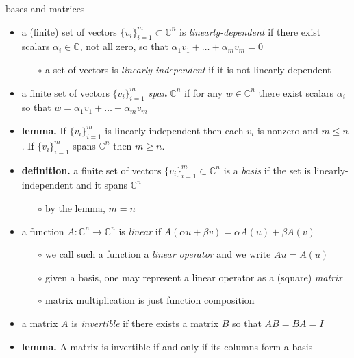 \documentclass[10pt,hyperref]{beamer}
\newcommand{\CC}{\mathbb{C}}
\begin{document}
\begin{frame}{bases and matrices}

\begin{itemize}
\item a (finite) set of vectors $\{v_i\}_{i=1}^m \subset \CC^n$ is \emph{linearly-dependent} if there exist scalars $\alpha_i \in \CC$, not all zero, so that $\alpha_1 v_1 + \dots + \alpha_m v_m = 0$
    \begin{itemize}
    \item[$\circ$] a set of vectors is \emph{linearly-independent} if it is not linearly-dependent
    \end{itemize}
\item a finite set of vectors $\{v_i\}_{i=1}^m$ \emph{span} $\CC^n$ if for any $w\in \CC^n$ there exist scalars $\alpha_i$ so that $w = \alpha_1 v_1 + \dots + \alpha_m v_m$
\item \textbf{lemma.}  If $\{v_i\}_{i=1}^m$ is linearly-independent then each $v_i$ is nonzero and $m \le n$.  If $\{v_i\}_{i=1}^m$ spans $\CC^n$ then $m \ge n$.
\item \textbf{definition.} a finite set of vectors $\{v_i\}_{i=1}^m \subset \CC^n$ is a \emph{basis} if the set is linearly-independent and it spans $\CC^n$
    \begin{itemize}
    \item[$\circ$] by the lemma, $m=n$
    \end{itemize}
\item a function $A:\CC^n \to \CC^n$ is \emph{linear} if $A(\alpha u+\beta v) = \alpha A(u) + \beta A(v)$
    \begin{itemize}
    \item[$\circ$] we call such a function a \emph{linear operator} and we write $Au=A(u)$
    \item[$\circ$] given a basis, one may represent a linear operator as a (square) \emph{matrix}
    \item[$\circ$] matrix multiplication is just function composition
    \end{itemize}
\item a matrix $A$ is \emph{invertible} if there exists a matrix $B$ so that $AB=BA=I$
\item \textbf{lemma.} A matrix is invertible if and only if its columns form a basis
\end{itemize}
\end{frame}
\end{document}
